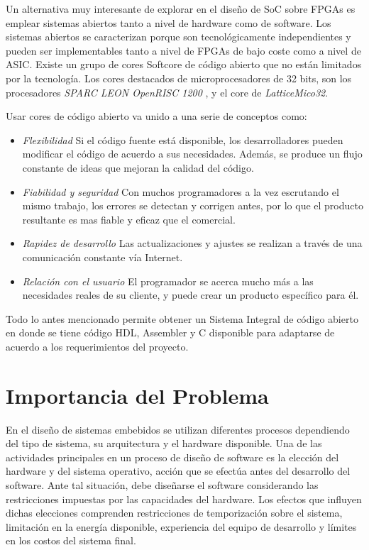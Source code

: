 Un alternativa muy interesante de explorar en el diseño de SoC sobre FPGAs es emplear sistemas abiertos tanto  a nivel de hardware como de software.
Los sistemas abiertos se caracterizan porque son tecnológicamente independientes y pueden ser implementables tanto a nivel de FPGAs de bajo coste
como a nivel de ASIC. Existe un grupo de cores Softcore de código abierto que no están limitados por la tecnología. Los cores destacados de
microprocesadores de 32 bits, son los procesadores \textit{SPARC LEON OpenRISC 1200} , y el core de \textit{LatticeMico32}. 

Usar cores de código abierto va unido a una serie de conceptos como:
\begin {itemize}
	\item \textit{Flexibilidad}  Si el código fuente está disponible, los desarrolladores pueden modificar el código de acuerdo a sus necesidades.
	Además, se produce un flujo constante de ideas que mejoran la calidad del código.
	\item \textit{Fiabilidad y seguridad}  Con muchos programadores a la vez escrutando el mismo trabajo, los errores se detectan y corrigen antes, por lo que
	el producto resultante es mas fiable y eficaz que el comercial.
	\item \textit{Rapidez de desarrollo} Las actualizaciones y ajustes se realizan a través de una comunicación constante vía Internet.
	\item \textit{Relación con el usuario} El programador se acerca mucho más a las necesidades reales de su cliente, y puede crear un producto
	específico para él.
 \end {itemize}

Todo lo antes mencionado permite obtener un Sistema Integral de código abierto en donde se tiene código HDL, Assembler y C disponible para adaptarse
de acuerdo a los requerimientos del proyecto. 

\section{Importancia del Problema}
En el diseño de sistemas embebidos se utilizan diferentes procesos dependiendo del tipo de sistema, su arquitectura y el hardware disponible. Una de
las actividades principales en un proceso de diseño de software es la elección del hardware y del sistema operativo, acción que se efectúa antes del
desarrollo del software. Ante tal situación, debe diseñarse el software considerando las restricciones impuestas por las capacidades del hardware.
Los efectos que influyen dichas elecciones comprenden restricciones de temporización sobre el sistema, limitación en la energía disponible,
experiencia del equipo de desarrollo y límites en los costos del sistema final.

